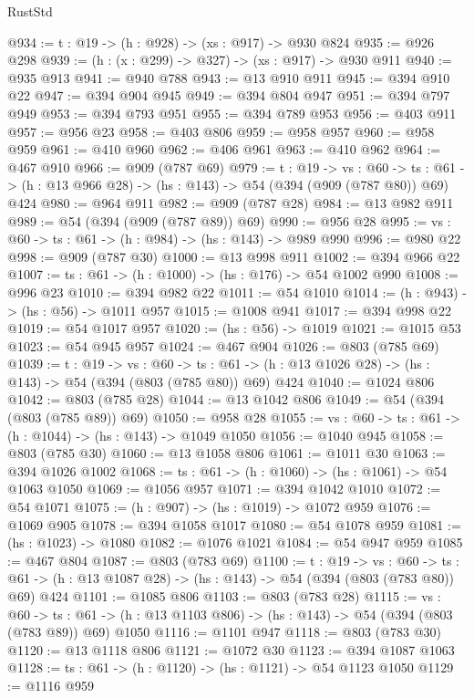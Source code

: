 \begin{lexlean}{RustStd}
\begin{coremodule}
{\begin{coremodule}
{{{{{{{{@934 := {t : @19} -> (h : @928) -> (xs : @917) -> @930 @824
@935 := @926 @298
@939 := (h : (x : @299) -> @327) -> (xs : @917) -> @930 @911
@940 := @935 @913
@941 := @940 @788
@943 := @13 @910 @911
@945 := @394 @910 @22
@947 := @394 @904 @945
@949 := @394 @804 @947
@951 := @394 @797 @949
@953 := @394 @793 @951
@955 := @394 @789 @953
@956 := @403 @911
@957 := @956 @23
@958 := @403 @806
@959 := @958 @957
@960 := @958 @959
@961 := @410 @960
@962 := @406 @961
@963 := @410 @962
@964 := @467 @910
@966 := @909 (@787 @69)
@979 := {t : @19} ->
  {vs : @60} ->
  {ts : @61} -> (h : @13 @966 @28) -> (hs : @143) -> @54 (@394 (@909 (@787 @80)) @69) @424
@980 := @964 @911
@982 := @909 (@787 @28)
@984 := @13 @982 @911
@989 := @54 (@394 (@909 (@787 @89)) @69)
@990 := @956 @28
@995 := {vs : @60} -> {ts : @61} -> (h : @984) -> (hs : @143) -> @989 @990
@996 := @980 @22
@998 := @909 (@787 @30)
@1000 := @13 @998 @911
@1002 := @394 @966 @22
@1007 := {ts : @61} -> (h : @1000) -> (hs : @176) -> @54 @1002 @990
@1008 := @996 @23
@1010 := @394 @982 @22
@1011 := @54 @1010
@1014 := (h : @943) -> (hs : @56) -> @1011 @957
@1015 := @1008 @941
@1017 := @394 @998 @22
@1019 := @54 @1017 @957
@1020 := (hs : @56) -> @1019
@1021 := @1015 @53
@1023 := @54 @945 @957
@1024 := @467 @904
@1026 := @803 (@785 @69)
@1039 := {t : @19} ->
  {vs : @60} ->
  {ts : @61} -> (h : @13 @1026 @28) -> (hs : @143) -> @54 (@394 (@803 (@785 @80)) @69) @424
@1040 := @1024 @806
@1042 := @803 (@785 @28)
@1044 := @13 @1042 @806
@1049 := @54 (@394 (@803 (@785 @89)) @69)
@1050 := @958 @28
@1055 := {vs : @60} -> {ts : @61} -> (h : @1044) -> (hs : @143) -> @1049 @1050
@1056 := @1040 @945
@1058 := @803 (@785 @30)
@1060 := @13 @1058 @806
@1061 := @1011 @30
@1063 := @394 @1026 @1002
@1068 := {ts : @61} -> (h : @1060) -> (hs : @1061) -> @54 @1063 @1050
@1069 := @1056 @957
@1071 := @394 @1042 @1010
@1072 := @54 @1071
@1075 := (h : @907) -> (hs : @1019) -> @1072 @959
@1076 := @1069 @905
@1078 := @394 @1058 @1017
@1080 := @54 @1078 @959
@1081 := (hs : @1023) -> @1080
@1082 := @1076 @1021
@1084 := @54 @947 @959
@1085 := @467 @804
@1087 := @803 (@783 @69)
@1100 := {t : @19} ->
  {vs : @60} ->
  {ts : @61} -> (h : @13 @1087 @28) -> (hs : @143) -> @54 (@394 (@803 (@783 @80)) @69) @424
@1101 := @1085 @806
@1103 := @803 (@783 @28)
@1115 := {vs : @60} ->
  {ts : @61} -> (h : @13 @1103 @806) -> (hs : @143) -> @54 (@394 (@803 (@783 @89)) @69) @1050
@1116 := @1101 @947
@1118 := @803 (@783 @30)
@1120 := @13 @1118 @806
@1121 := @1072 @30
@1123 := @394 @1087 @1063
@1128 := {ts : @61} -> (h : @1120) -> (hs : @1121) -> @54 @1123 @1050
@1129 := @1116 @959
}}}}}}}}
\end{coremodule}}
\end{coremodule}
\end{lexlean}
